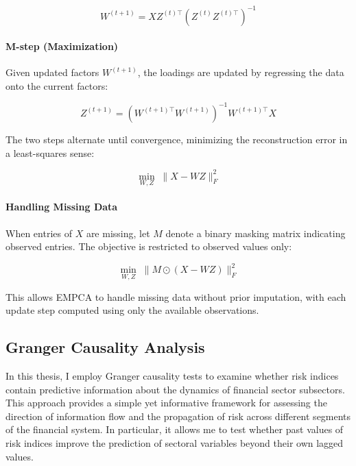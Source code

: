 \documentclass[12pt,a4paper]{report}\usepackage[a4paper, top=2.5cm, bottom=2.5cm, left=2.5cm, right=2.5cm]{geometry}
\begin{document}
\begin{equation}
W^{(t+1)} = XZ^{(t)\top} \left(Z^{(t)}Z^{(t)\top}\right)^{-1}
\end{equation}

\paragraph{M-step (Maximization)}
Given updated factors $W^{(t+1)}$, the loadings are updated by regressing 
the data onto the current factors:

\begin{equation}
Z^{(t+1)} = \left(W^{(t+1)\top}W^{(t+1)}\right)^{-1} W^{(t+1)\top}X
\end{equation}

The two steps alternate until convergence, minimizing the reconstruction 
error in a least-squares sense:

\begin{equation}
\min_{W,Z} \; \|X - WZ\|_F^2
\end{equation}

\paragraph{Handling Missing Data}
When entries of $X$ are missing, let $M$ denote a binary masking matrix 
indicating observed entries. The objective is restricted to observed 
values only:

\begin{equation}
\min_{W,Z} \; \|M \odot (X - WZ)\|_F^2
\end{equation}

This allows EMPCA to handle missing data without prior imputation, with 
each update step computed using only the available observations.




\subsection{Granger Causality Analysis}

In this thesis, I employ Granger causality tests to examine whether risk indices contain predictive
information about the dynamics of financial sector subsectors. This approach provides a simple yet
informative framework for assessing the direction of information flow and the propagation of risk
across different segments of the financial system. In particular, it allows me to test whether past
values of risk indices improve the prediction of sectoral variables beyond their own lagged values.
\end{document}
